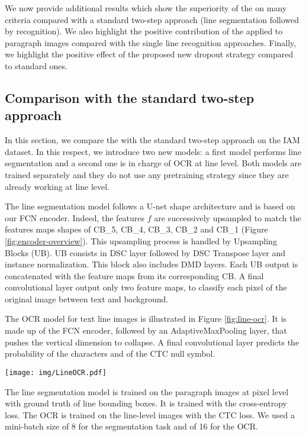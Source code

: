 We now provide additional results which show the superiority of the \modelacc{} on many criteria compared with a standard two-step approach (line segmentation followed by recognition).
We also highlight the positive contribution of the \modelacc{} applied to paragraph images compared with the single line recognition approaches.
Finally, we highlight the positive effect of the proposed new dropout strategy compared to standard ones.

\subsection{Comparison with the standard two-step approach}
In this section, we compare the \modelacc{} with the standard two-step approach on the IAM dataset. In this respect, we introduce two new models: a first model performs line segmentation and a second one is in charge of OCR at line level. Both models are trained separately and they do not use any pretraining strategy since they are already working at line level.

The line segmentation model follows a U-net shape architecture and is based on our FCN encoder. Indeed, the features $f$ are successively upsampled to match the features maps shapes of CB\_5, CB\_4, CB\_3, CB\_2 and CB\_1 (Figure \ref{fig:encoder-overview}). This upsampling process is handled by Upsampling Blocks (UB). UB consists in DSC layer followed by DSC Transpose layer and instance normalization. This block also includes DMD layers. Each UB output is concatenated with the feature maps from its corresponding CB. A final convolutional layer output only two feature maps, to classify each pixel of the original image between text and background.


The OCR model for text line images is illustrated in Figure \ref{fig:line-ocr}. It is made up of the FCN encoder, followed by an AdaptiveMaxPooling layer, that pushes the vertical dimension to collapse. A final convolutional layer predicts the probability of the characters and of the CTC null symbol.

\begin{figure*}[htbp!]
\centering
\texttt{[image: img/LineOCR.pdf]}
        \caption{Text line recognition architecture overview.}
        \label{fig:line-ocr}
\end{figure*}

 The line segmentation model is trained on the paragraph images at pixel level with ground truth of line bounding boxes. It is trained with the cross-entropy loss. The OCR is trained on the line-level images with the CTC loss. We used a mini-batch size of 8 for the segmentation task and of 16 for the OCR.

